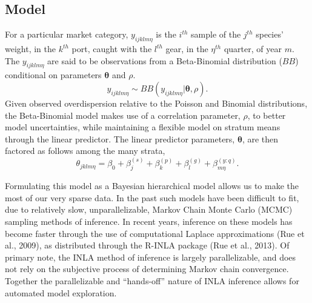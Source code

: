 \documentclass[12pt]{article}
\begin{document}
\subsection{Model}\label{model}
%
For a particular market category, $y_{ijklm\eta}$ is the $i^{th}$ sample
of the $j^{th}$ species' weight, in the $k^{th}$ port, caught with the
$l^{th}$ gear, in the $\eta^{th}$ quarter, of year $m$. 
The $y_{ijklm\eta}$ are said to be observations from a Beta-Binomial distribution ($BB$) conditional on parameters $\bm{\theta}$ and $\rho$.
\[y_{ijklm\eta} \sim BB(y_{ijklm\eta}|\bm{\theta}, \rho).\] 
Given observed overdispersion relative to the Poisson and Binomial distributions, 
the Beta-Binomial model makes use of a correlation parameter, $\rho$, to better 
model uncertainties, while maintaining a flexible model on stratum means through the linear predictor. %
The linear predictor parameters, $\bm{\theta}$, are then factored as follows among the many strata,
\[\theta_{jklm\eta} = \beta_0 + \beta^{(s)}_j + \beta^{(p)}_k + \beta^{(g)}_l + \beta^{(y:q)}_{m\eta}.\]



%
Formulating this model as a Bayesian hierarchical model allows us to make the most of our very sparse data.
In the past such models have been difficult to fit, due to relatively
slow, unparallelizable, Markov Chain Monte Carlo (MCMC) sampling methods
of inference. In recent years, inference on these models has become
faster through the use of computational Laplace approximations (Rue et al.,
2009), as distributed through the R-INLA package (Rue et al., 2013). Of
primary note, the INLA method of inference is largely parallelizable,
and does not rely on the subjective process of determining Markov chain
convergence. Together the parallelizable and ``hands-off'' nature of
INLA inference allows for automated model exploration.
\end{document}
